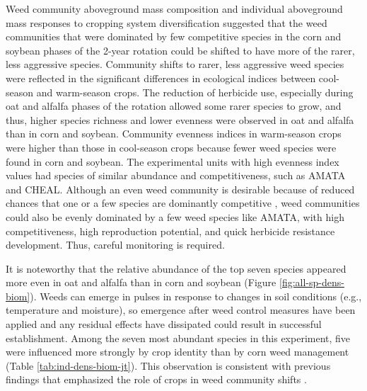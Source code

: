 \documentclass[
]{article}
\begin{document}
Weed community aboveground mass composition and individual aboveground mass responses to cropping system diversification suggested that the weed communities that were dominated by few competitive species in the corn and soybean phases of the 2-year rotation could be shifted to have more of the rarer, less aggressive species. Community shifts to rarer, less aggressive weed species were reflected in the significant differences in ecological indices between cool-season and warm-season crops. The reduction of herbicide use, especially during oat and alfalfa phases of the rotation allowed some rarer species to grow, and thus, higher species richness and lower evenness were observed in oat and alfalfa than in corn and soybean. Community evenness indices in warm-season crops were higher than those in cool-season crops because fewer weed species were found in corn and soybean. The experimental units with high evenness index values had species of similar abundance and competitiveness, such as AMATA and CHEAL. Although an even weed community is desirable because of reduced chances that one or a few species are dominantly competitive \citep{adeuxMitigatingCropYield2019}, weed communities could also be evenly dominated by a few weed species like AMATA, with high competitiveness, high reproduction potential, and quick herbicide resistance development. Thus, careful monitoring is required.

It is noteworthy that the relative abundance of the top seven species appeared more even in oat and alfalfa than in corn and soybean (Figure \ref{fig:all-sp-dens-biom}). Weeds can emerge in pulses in response to changes in soil conditions (e.g., temperature and moisture), so emergence after weed control measures have been applied and any residual effects have dissipated could result in successful establishment. Among the seven most abundant species in this experiment, five were influenced more strongly by crop identity than by corn weed management (Table \ref{tab:ind-dens-biom-jt}). This observation is consistent with previous findings that emphasized the role of crops in weed community shifts \citep{davisWeedSeedbankCommunity2005, smithAssemblyWeedCommunities2007, owenWeedSpeciesShifts2008, friedTrajectoriesWeedCommunities2012}.
\end{document}
